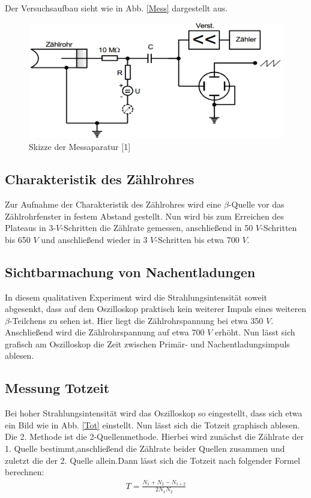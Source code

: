 Der Versuchsaufbau sieht wie in Abb. \eqref{Mess} dargestellt aus.
	\begin{figure}[h]
		\begin{center}
		\includegraphics[scale=1.0]{Messaparatur.png}
		\caption{Skizze der Messaparatur [1]}
		\label{Mess}
		\end{center}	
	\end{figure}
\subsection{Charakteristik des Zählrohres}
Zur Aufnahme der Charakteristik des Zählrohres wird eine $\beta$-Quelle vor das Zählrohrfenster in festem Abstand gestellt.
Nun wird bis zum Erreichen des Plateaus in 3-$V$-Schritten die Zählrate gemessen, anschließend in 50 $V$-Schritten bis 650 $V$ und anschließend wieder in 3 $V$-Schritten bis etwa 700 $V$.
\subsection{Sichtbarmachung von Nachentladungen}
In diesem qualitativen Experiment wird die Strahlungsintensität soweit abgesenkt, dass auf dem Oszilloskop praktisch kein weiterer Impuls eines weiteren $\beta$-Teilchens zu sehen ist. Hier liegt die Zählrohrspannung bei etwa 350 $V$. Anschließend wird die Zählrohrspannung auf etwa 700 $V$ erhöht.
Nun lässt sich grafisch am Oszilloskop die Zeit zwischen Primär- und Nachentladungsimpuls ablesen.
\subsection{Messung Totzeit}
Bei hoher Strahlungsintensität wird das Oszilloskop so eingestellt, dass sich etwa ein Bild wie in Abb. \eqref{Tot} einstellt. Nun lässt sich die Totzeit graphisch ablesen.\\
Die 2. Methode ist die 2-Quellenmethode. Hierbei wird zunächst die Zählrate der 1. Quelle bestimmt,anschließend die Zählrate beider Quellen zusammen und zuletzt die der 2. Quelle allein.Dann lässt sich die Totzeit nach folgender Formel berechnen:\\
\begin{align}
T=\frac{N_{1}+N_{2}-N_{1+2}}{2N_{1}N_{2}}
\label{2}
\end{align}\\
